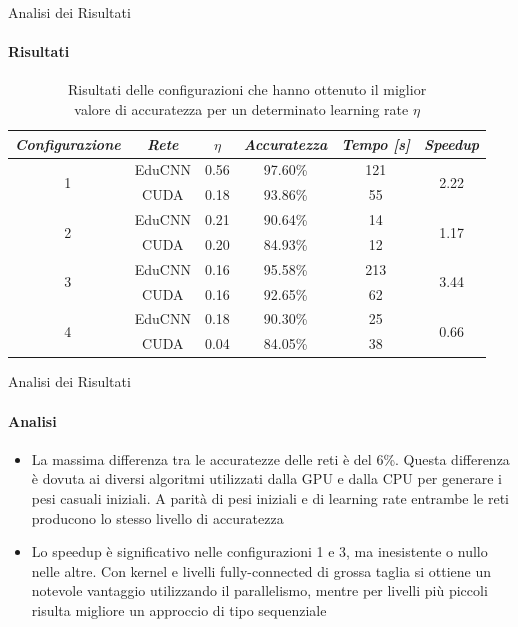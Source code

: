 \documentclass[
 ]{beamer}
\begin{document}
\begin{frame}{Analisi dei Risultati}
    \framesubtitle{Risultati}
    \bigskip
    \bigskip
        \begin{table}
            \centering
            \renewcommand\arraystretch{1.3}
            \small
            \begin{tabular}{| c | c | c | c | c | c |}
                \hline
                \emph{Configurazione} & \emph{Rete} & $\eta$ & \emph{Accuratezza} & \emph{Tempo [s]} & \emph{Speedup} \\
                \hline
                \multirow{2}{*}{1} & EduCNN & 0.56 & 97.60\% & 121 & \multirow{2}{*}{2.22} \\ \cline{2-5} 
                                   & CUDA   & 0.18 & 93.86\% & 55 & \\                               
                \hline
                \multirow{2}{*}{2} & EduCNN & 0.21 & 90.64\% & 14 & \multirow{2}{*}{1.17} \\ \cline{2-5}
                                   & CUDA   & 0.20 & 84.93\% & 12 & \\
                \hline
                \multirow{2}{*}{3} & EduCNN & 0.16 & 95.58\% & 213 & \multirow{2}{*}{3.44} \\ \cline{2-5} 
                                   & CUDA   & 0.16 & 92.65\% & 62 & \\
                \hline
                \multirow{2}{*}{4} & EduCNN & 0.18 & 90.30\% & 25 & \multirow{2}{*}{0.66} \\ \cline{2-5}
                                   & CUDA   & 0.04 & 84.05\% & 38 & \\
                \hline                
            \end{tabular}
            \caption
    {Risultati delle configurazioni che hanno ottenuto il miglior \\ valore di accuratezza per un determinato learning rate $\eta$\endtabular}          
        \end{table}    
\end{frame}

\begin{frame}{Analisi dei Risultati}
    \framesubtitle{Analisi}
    \smallskip
    \begin{itemize} [<+->]
        \setlength\itemsep{2em}
        \item \large La massima differenza tra le accuratezze delle reti è del 6\%. Questa differenza è dovuta ai diversi algoritmi utilizzati dalla GPU e dalla CPU per generare i pesi casuali iniziali. A parità di pesi iniziali e di learning rate entrambe le reti producono lo stesso livello di accuratezza
        \item \large Lo speedup è significativo nelle configurazioni 1 e 3, ma inesistente o nullo nelle altre. Con kernel e livelli fully-connected di grossa taglia si ottiene un notevole vantaggio utilizzando il parallelismo, mentre per livelli più piccoli risulta migliore un approccio di tipo sequenziale
    \end{itemize}     
\end{frame}
\end{document}
